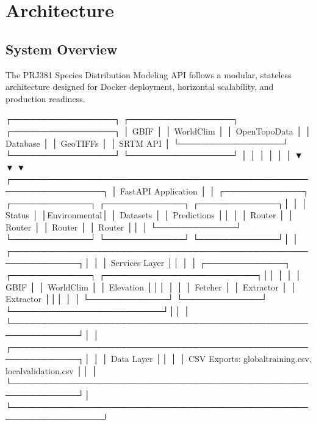 \documentclass[letterpaper,10pt,english]{sphinxmanual}
\begin{document}
\sphinxstepscope


\chapter{Architecture}
\label{\detokenize{architecture:architecture}}\label{\detokenize{architecture::doc}}

\section{System Overview}
\label{\detokenize{architecture:system-overview}}
\sphinxAtStartPar
The PRJ381 Species Distribution Modeling API follows a modular, stateless architecture designed for Docker deployment, horizontal scalability, and production readiness.

\begin{sphinxVerbatim}[commandchars=\\\{\}]
┌─────────────────┐    ┌─────────────────┐    ┌─────────────────┐
│      GBIF       │    │   WorldClim     │    │  Open\PYGZhy{}Topo\PYGZhy{}Data │
│    Database     │    │   GeoTIFFs      │    │   SRTM API      │
└─────────────────┘    └─────────────────┘    └─────────────────┘
        │                        │                        │
        │                        │                        │
        ▼                        ▼                        ▼
┌─────────────────────────────────────────────────────────────────┐
│                  FastAPI Application                            │
│  ┌─────────────┐ ┌─────────────┐ ┌─────────────┐ ┌─────────────┐│
│  │   Status    │ │Environmental│ │  Datasets   │ │ Predictions ││
│  │   Router    │ │   Router    │ │   Router    │ │   Router    ││
│  └─────────────┘ └─────────────┘ └─────────────┘ └─────────────┘│
│  ┌─────────────────────────────────────────────────────────────┐│
│  │                     Services Layer                          ││
│  │  ┌─────────────┐ ┌─────────────┐ ┌─────────────────────────┐││
│  │  │    GBIF     │ │  WorldClim  │ │       Elevation         │││
│  │  │   Fetcher   │ │  Extractor  │ │       Extractor         │││
│  │  └─────────────┘ └─────────────┘ └─────────────────────────┘││
│  └─────────────────────────────────────────────────────────────┘│
│  ┌─────────────────────────────────────────────────────────────┐│
│  │                     Data Layer                              ││
│  │  CSV Exports: global\PYGZus{}training.csv, local\PYGZus{}validation.csv     ││
│  └─────────────────────────────────────────────────────────────┘│
└─────────────────────────────────────────────────────────────────┘
\end{sphinxVerbatim}
\end{document}
